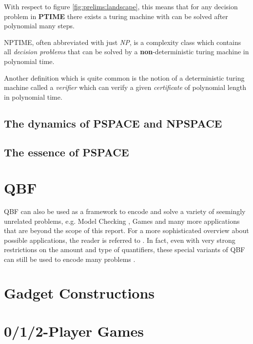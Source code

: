 			With respect to figure \ref{fig:prelims:landscape}, this means that for any decision problem in \textbf{PTIME} there exists a turing machine with can be solved after polynomial many steps.
			
			\begin{defStrich}[NPTIME]
				NPTIME, often abbreviated with just \textit{NP}, is a complexity class which contains all \textit{decision problems} that can be solved by a \textbf{non}-deterministic turing machine in polynomial time.
			\end{defStrich}
			
			Another definition which is quite common is the notion of a deterministic turing machine called a \textit{verifier} which can verify a given \textit{certificate} of polynomial length in polynomial time.
		
		\subsection{The dynamics of PSPACE and NPSPACE}
		
		\subsection{The essence of PSPACE}
	
	\section{\ac{QBF}}
	
	
		QBF can also be used as a framework to encode and solve a variety of seemingly unrelated problems, e.g. Model Checking \cite{Baier.2008?}, Games \cite{Ani.2022} and many more applications that are beyond the scope of this report.
		For a more sophisticated overview about possible applications, the reader is referred to \cite{Shukla.2019}.
		In fact, even with very strong restrictions on the amount and type of quantifiers, these special variants of \ac{QBF} can still be used to encode many problems \cite{Balabanov.2016}.
	
	\section{Gadget Constructions}
	
	\section{0/1/2-Player Games}